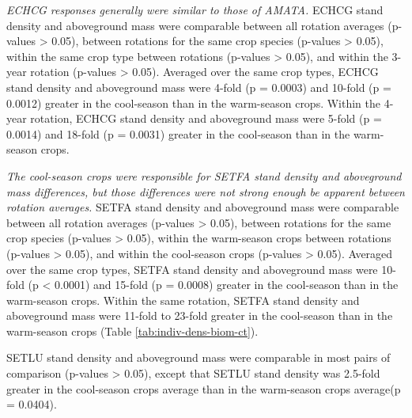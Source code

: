 \documentclass[
]{article}
\begin{document}
\emph{ECHCG responses generally were similar to those of AMATA.} ECHCG stand density and aboveground mass were comparable between all rotation averages (p-values \textgreater{} 0.05), between rotations for the same crop species (p-values \textgreater{} 0.05), within the same crop type between rotations (p-values \textgreater{} 0.05), and within the 3-year rotation (p-values \textgreater{} 0.05). Averaged over the same crop types, ECHCG stand density and aboveground mass were 4-fold (p = 0.0003) and 10-fold (p = 0.0012) greater in the cool-season than in the warm-season crops. Within the 4-year rotation, ECHCG stand density and aboveground mass were 5-fold (p = 0.0014) and 18-fold (p = 0.0031) greater in the cool-season than in the warm-season crops.

\emph{The cool-season crops were responsible for SETFA stand density and aboveground mass differences, but those differences were not strong enough be apparent between rotation averages.} SETFA stand density and aboveground mass were comparable between all rotation averages (p-values \textgreater{} 0.05), between rotations for the same crop species (p-values \textgreater{} 0.05), within the warm-season crops between rotations (p-values \textgreater{} 0.05), and within the cool-season crops (p-values \textgreater{} 0.05). Averaged over the same crop types, SETFA stand density and aboveground mass were 10-fold (p \textless{} 0.0001) and 15-fold (p = 0.0008) greater in the cool-season than in the warm-season crops. Within the same rotation, SETFA stand density and aboveground mass were 11-fold to 23-fold greater in the cool-season than in the warm-season crops (Table \ref{tab:indiv-dens-biom-ct}).

SETLU stand density and aboveground mass were comparable in most pairs of comparison (p-values \textgreater{} 0.05), except that SETLU stand density was 2.5-fold greater in the cool-season crops average than in the warm-season crops average(p = 0.0404).
\end{document}
